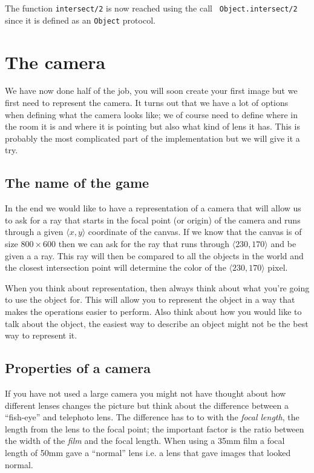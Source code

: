 \documentclass[a4paper,11pt]{article}
\begin{document}
 The function {\tt intersect/2} is now reached using the call {\tt
   Object.intersect/2} since it is defined as an {\tt Object}
 protocol.

 


\section{The camera}

We have now done half of the job, you will soon create your first
image but we first need to represent the camera. It turns out that we
have a lot of options when defining what the camera looks like; we of
course need to define where in the room it is and where it is pointing
but also what kind of lens it has. This is probably the most
complicated part of the implementation but we will give it a try.

\subsection*{The name of the game}
In the end we would like to have a representation of a camera that
will allow us to ask for a ray that starts in the focal point (or
origin) of the camera and runs through a given $\langle x, y\rangle$
coordinate of the canvas. If we know that the canvas is of size
$800 \times 600$
then we can ask for the ray that runs through
$\langle 230, 170\rangle$
and be given a a ray. This ray will then be compared to all the
objects in the world and the closest intersection point will determine
the color of the $\langle 230, 170\rangle$ pixel.

When you think about representation, then always think about what
you're going to use the object for. This will allow you to represent
the object in a way that makes the operations easier to perform. Also
think about how you would like to talk about the object, the easiest
way to describe an object might not be the best way to represent it.

\subsection*{Properties of a camera}
If you have not used a large camera you might not have thought about
how different lenses changes the picture but think about the
difference between a ``fish-eye'' and telephoto lens. The difference
has to to with the {\em focal length}, the length from the lens to the
focal point; the important factor is the ratio between the width of
the {\em film} and the focal length. When using a 35mm film a focal
length of 50mm gave a ``normal'' lens i.e. a lens that gave images
that looked normal.
\end{document}
